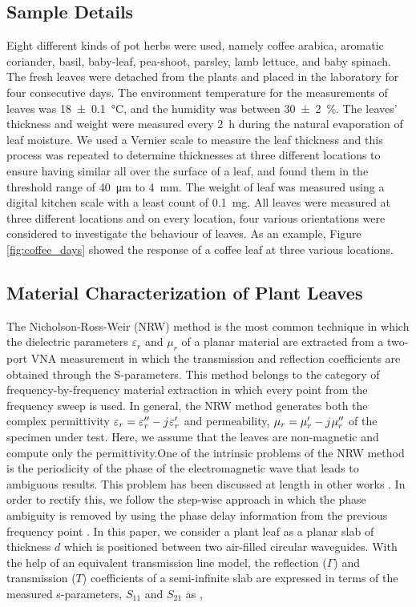 \documentclass[journal,article,submit,moreauthors,pdftex]{Definitions/mdpi}
\renewcommand{\^}{\hat}  %
\renewcommand{\j}{{j}\mkern1mu} %
\begin{document}
\subsection{Sample Details}
%
Eight different kinds of pot herbs were used, namely coffee arabica, aromatic coriander, basil, baby-leaf, pea-shoot, parsley, lamb lettuce, and baby spinach. The fresh leaves were detached from the plants and placed in the laboratory for four consecutive days. The environment temperature for the measurements of leaves was \SI{18 \pm .1}{\celsius}, and the humidity was between \SI{30 \pm 2}{\percent}. The leaves' thickness and weight were measured every \SI{2}{\hour} during the natural evaporation of leaf moisture. We used a Vernier scale to measure the leaf thickness and this process was repeated to determine thicknesses at three different locations to ensure having similar all over the surface of a leaf, and found them in the threshold range of \SI{40}{\micro\m} to \SI{4}{\milli \metre}. The weight of leaf was measured using a digital kitchen scale with a least count of \SI{.1}{\mg}. All leaves were measured at three different locations and on every location, four various orientations were considered to investigate the behaviour of leaves. As an example, Figure \ref{fig:coffee_days} showed the response of a coffee leaf at three various locations.

\subsection{Material Characterization of Plant Leaves}
%
The Nicholson-Ross-Weir (NRW) method \cite{nrw} is the most common technique in which the dielectric parameters $\varepsilon_r$ and $\mu_r$ of a planar material are extracted from a two-port VNA measurement in which the transmission and reflection coefficients are obtained through the S-parameters. This method belongs to the category of frequency-by-frequency material extraction in which every point from the frequency sweep is used. In general, the NRW method generates both the complex permittivity $\varepsilon_r = \varepsilon_r'' - \j \varepsilon_r'$ and permeability, $\mu_r = \mu_r' - \j \mu_r''$ of the specimen under test. Here, we assume that the leaves are non-magnetic and compute only the permittivity.One of the intrinsic problems of the NRW method is the periodicity of the phase of the electromagnetic wave that leads to ambiguous results. This problem has been discussed at length in other works \cite{Weir1974,Baker1990,costa_electromagnetic_2017}. In order to rectify this, we follow the step-wise approach in which the phase ambiguity is removed by using the phase delay information from the previous frequency point \cite{Luukkonen2011}. In this paper, we consider a plant leaf as a planar slab of thickness $d$ which is positioned between two air-filled circular waveguides. With the help of an equivalent transmission line model, the reflection ($\Gamma$) and transmission ($T$) coefficients of a semi-infinite slab are expressed in terms of the measured s-parameters, $S_{11}$ and $S_{21}$ as \cite{boughriet_noniterative_1997},
\end{document}

